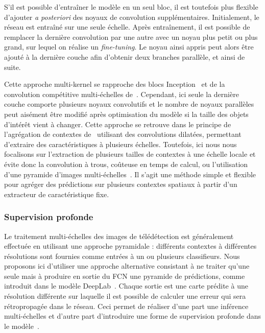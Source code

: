 S'il est possible d'entraîner le modèle en un seul bloc, il est toutefois plus flexible d'ajouter \emph{a posteriori} des noyaux de convolution supplémentaires. Initialement, le réseau est entraîné sur une seule échelle. Après entraînement, il est possible de remplacer la dernière convolution par une autre avec un noyau plus petit ou plus grand, sur lequel on réalise un \emph{fine-tuning}. Le noyau ainsi appris peut alors être ajouté à la dernière couche afin d'obtenir deux branches parallèle, et ainsi de suite.

Cette approche multi-kernel se rapproche des blocs Inception~\cite{szegedy_going_2015} et de la convolution compétitive multi-échelles de~\citet{liao_competitive_2015}. Cependant, ici seule la dernière couche comporte plusieurs noyaux convolutifs et le nombre de noyaux parallèles peut aisément être modifié après optimisation du modèle si la taille des objets d'intérêt vient à changer. Cette approche se retrouve dans le principe de l'agrégation de contextes de~\citet{yu_multi-scale_2015} utilisant des convolutions dilatées, permettant d'extraire des caractéristiques à plusieurs échelles. Toutefois, ici nous nous focalisons sur l'extraction de plusieurs tailles de contextes à une échelle locale et évite donc la convolution à trous, coûteuse en temps de calcul, ou l'utilisation d'une pyramide d'images multi-échelles~\cite{zhao_learning_2016}. Il s'agit une méthode simple et flexible pour agréger des prédictions sur plusieurs contextes spatiaux à partir d'un extracteur de caractéristique fixe.

\subsubsection{Supervision profonde}

Le traitement multi-échelles des images de télédétection est généralement effectuée en utilisant une approche pyramidale : différents contextes à différentes résolutions sont fournies comme entrées à un ou plusieurs classifieurs. Nous proposons ici d'utiliser une approche alternative consistant à ne traiter qu'une seule mais à produire en sortie du \gls{FCN} une pyramide de prédictions, comme introduit dans le modèle DeepLab~\cite{l._c._chen_deeplab_2018}. Chaque sortie est une carte prédite à une résolution différente sur laquelle il est possible de calculer une erreur qui sera rétropropagée dans le réseau. Ceci permet de réaliser d'une part une inférence multi-échelles et d'autre part d'introduire une forme de supervision profonde dans le modèle~\cite{lee_deeply-supervised_2015}.

